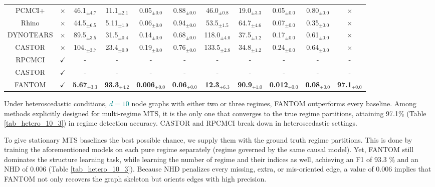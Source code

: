 \begin{table}[H]
{\begin{tabular}{@{}cc|cccccccc|c@{}}
PCMCI+ & $\times$ & 46.1$_{\pm4.7}$ & 11.1$_{\pm2.1}$ & 0.05$_{\pm0.0}$ & 0.88$_{\pm0.0}$ & 46.0$_{\pm0.8}$ & 19.0$_{\pm3.3}$ & 0.05$_{\pm0.0}$ & 0.80$_{\pm0.0}$ & $\times$ \\
    Rhino & $\times$ &  44.5$_{\pm6.5}$ & 5.11$_{\pm1.9}$ & 0.06$_{\pm0.0}$ & 0.94$_{\pm0.0}$ & 53.5$_{\pm1.5}$ & 64.7$_{\pm4.6}$ & 0.07$_{\pm0.0}$ & 0.35$_{\pm0.0}$ & $\times$ \\
    DYNOTEARS & $\times$ &  89.5$_{\pm3.5}$ & 31.5$_{\pm0.4}$ & 0.14$_{\pm0.0}$ & 0.68$_{\pm0.0}$ & 118.0$_{\pm4.0}$ & 37.5$_{\pm1.2}$ & 0.17$_{\pm0.0}$ & 0.61$_{\pm0.0}$ & $\times$ \\
    CASTOR & $\times$ &  104.$_{\pm3.7}$ & 23.4$_{\pm0.9}$ & 0.19$_{\pm0.0}$ & 0.76$_{\pm0.0}$ & 133.5$_{\pm2.8}$ & 34.8$_{\pm1.2}$ & 0.24$_{\pm0.0}$ & 0.64$_{\pm0.0}$ & $\times$ \\
    \midrule
    RPCMCI & $\checkmark$ &  - & - & - & - & - & - & - & - & - \\
    CASTOR & $\checkmark$ &  - & - & - & - & - & - & - & - & - \\
    \rowcolor{gray!20} FANTOM & $\checkmark$  & \textbf{5.67}$_{\pm3.3}$& \textbf{93.3}$_{\pm4.2}$ & \textbf{0.006}$_{\pm0.0}$ & \textbf{0.06}$_{\pm0.0}$ & \textbf{12.3}$_{\pm6.3}$ & \textbf{90.9}$_{\pm1.0}$ & \textbf{0.012}$_{\pm0.0}$ & \textbf{0.08}$_{\pm0.0}$  & \textbf{97.1}$_{\pm0.0}$ \\\bottomrule
\end{tabular}}
\end{table}
Under heteroscedastic conditions, \textcolor{teal}{$d=10$} node graphs with either two or three regimes, FANTOM outperforms every baseline. Among methods explicitly designed for multi-regime MTS, it is the only one that converges to the true regime partitions, attaining 97.1\% (Table \ref{tab_hetero_10_3}) in regime detection accuracy. CASTOR and RPCMCI break down in heteroscedastic settings.

To give stationary MTS baselines the best possible chance, we supply them with the ground truth regime partitions. This is done by training the aforementioned models on each pure regime separately (regime governed by the same causal model). Yet, FANTOM still dominates the structure learning task, while learning the number of regime and their indices as well, achieving an F1 of 93.3 \% and an NHD of 0.006 (Table \ref{tab_hetero_10_3}). Because NHD penalizes every missing, extra, or mis-oriented edge, a value of 0.006 implies that FANTOM not only recovers the graph skeleton but orients edges with high precision.

